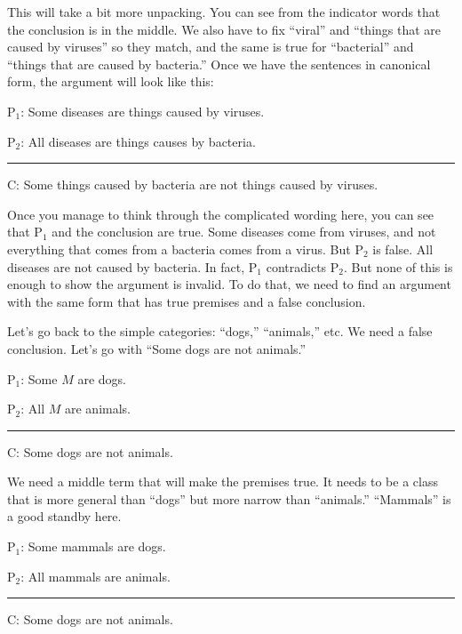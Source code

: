 {This will take a bit more unpacking. You can see from the indicator words that the conclusion is in the middle. We also have to fix ``viral'' and ``things that are caused by viruses'' so they match, and the same is true for ``bacterial'' and ``things that are caused by bacteria.'' Once we have the sentences in canonical form, the argument will look like this:

\begin{earg} 
\item[P$_1$:] Some diseases are things caused by viruses.
\item[P$_2$:] All diseases are things causes by bacteria.
\vspace{-.5em} 
 \item [] \rule{0.7\linewidth}{.5pt} 
\item[C:] Some things caused by bacteria are not things caused by viruses.
 \end{earg}

Once you manage to think through the complicated wording here, you can see that P$_1$ and the conclusion are true. Some diseases come from viruses, and not everything that comes from a bacteria comes from a virus. But P$_2$ is false. All diseases are not caused by bacteria. In fact, P$_1$ contradicts P$_2$. But none of this is enough to show the argument is invalid. To do that, we need to find an argument with the same form that has true premises and a false conclusion. 

Let's go back to the simple categories: ``dogs,'' ``animals,'' etc. We need a false conclusion. Let's go with ``Some dogs are not animals.'' 

\begin{earg} 
\item[P$_1$:] Some $M$ are dogs.
\item[P$_2$:] All $M$ are animals.
\vspace{-.5em} 
 \item [] \rule{0.3\linewidth}{.5pt} 
\item[C:] Some dogs are not animals.
 \end{earg}

We need a middle term that will make the premises true. It needs to be a class that is more general than ``dogs'' but more narrow than ``animals.'' ``Mammals'' is a good standby here.

\begin{earg} 
\item[P$_1$:] Some mammals are dogs.
\item[P$_2$:] All mammals are animals.
\vspace{-.5em} 
 \item [] \rule{0.3\linewidth}{.5pt} 
\item[C:] Some dogs are not animals.
 \end{earg}

}
